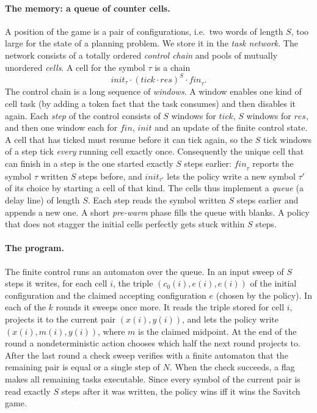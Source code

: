 \paragraph{The memory: a queue of counter cells.}
A position of the game is a pair of configurations, i.e.\ two words of length $S$, too large for
the state of a planning problem. We store it in the \emph{task network}. The network consists of a
totally ordered \emph{control chain} and pools of mutually unordered \emph{cells}. A cell for the
symbol $\tau$ is a chain
\[
  \mathit{init}_\tau\cdot(\mathit{tick}\cdot\mathit{res})^S\cdot\mathit{fin}_\tau .
\]
The control chain is a long sequence of \emph{windows}. A window enables one kind of cell task (by
adding a token fact that the task consumes) and then disables it again. Each \emph{step} of the
control consists of $S$ windows for $\mathit{tick}$, $S$ windows for $\mathit{res}$, and then one
window each for $\mathit{fin}$, $\mathit{init}$ and an update of the finite control state. A cell
that has ticked must resume before it can tick again, so the $S$ tick windows of a step tick
\emph{every} running cell exactly once. Consequently the unique cell that can finish in a step is
the one started exactly $S$ steps earlier: $\mathit{fin}_\tau$ reports the symbol $\tau$ written $S$
steps before, and $\mathit{init}_{\tau'}$ lets the policy write a new symbol $\tau'$ of its choice
by starting a cell of that kind. The cells thus implement a \emph{queue} (a delay line) of length
$S$. Each step reads the symbol written $S$ steps earlier and appends a new one. A short
\emph{pre-warm} phase fills the queue with blanks. A policy that does not stagger the initial cells
perfectly gets stuck within $S$ steps.

\paragraph{The program.}
The finite control runs an automaton over the queue. In an input sweep of $S$ steps it writes, for
each cell $i$, the triple $(c_0(i),e(i),e(i))$ of the initial configuration and the claimed
accepting configuration $e$ (chosen by the policy). In each of the $k$ rounds it sweeps once more.
It reads the triple stored for cell $i$, projects it to the current pair $(x(i),y(i))$, and lets the
policy write $(x(i),m(i),y(i))$, where $m$ is the claimed midpoint. At the end of the round a
nondeterministic action chooses which half the next round projects to. After the last round a
check sweep verifies with a finite automaton that the remaining pair is equal or a single step of
$N$. When the check succeeds, a flag makes all remaining tasks executable. Since every symbol of
the current pair is read exactly $S$ steps after it was written, the policy wins iff it wins the
Savitch game.

